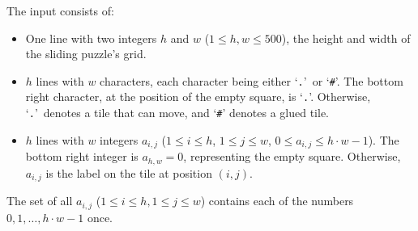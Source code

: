 
  The input consists of:
  \begin{itemize}
    \item One line with two integers $h$ and $w$ ($1 \le h,w \le 500$), the
      height and width of the sliding puzzle's grid.
    \item $h$ lines with $w$ characters,
      each character being either `\texttt{.}'\ or `\texttt{\#}'.
      The bottom right character, at the position of the empty square,
      is `\texttt{.}'.
      Otherwise, `\texttt{.}'\ denotes a tile that can move,
      and `\texttt{\#}' denotes a glued tile.
    \item $h$ lines with $w$ integers $a_{i,j}$
      ($1 \le i \le h$, $1 \le j \le w$, $0 \le a_{i,j} \le h \cdot w - 1$).
      The bottom right integer is $a_{h,w} = 0$, representing the empty square.
      Otherwise, $a_{i,j}$ is the label on the tile at position $(i,j)$.
  \end{itemize}
  The set of all $a_{i,j}$ ($1 \le i \le h, 1 \le j \le w$)
  contains each of the numbers $0, 1, \dots, h \cdot w - 1$ once.

